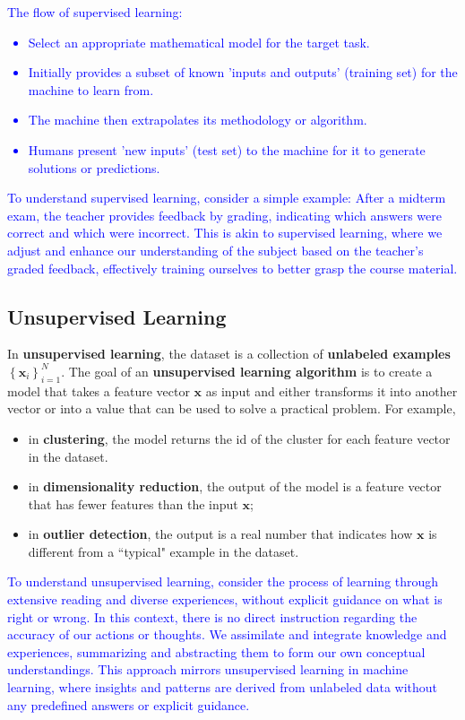 \textcolor{blue}{The flow of supervised learning:
\begin{itemize}
    \item Select an appropriate mathematical model for the target task.
    \item Initially provides a subset of known 'inputs and outputs' (training set) for the machine to learn from.
    \item The machine then extrapolates its methodology or algorithm.
    \item Humans present 'new inputs' (test set) to the machine for it to generate solutions or predictions.
\end{itemize}
}
\textcolor{blue}{To understand supervised learning, consider a simple example: After a midterm exam, the teacher provides feedback by grading, indicating which answers were correct and which were incorrect. This is akin to supervised learning, where we adjust and enhance our understanding of the subject based on the teacher's graded feedback, effectively training ourselves to better grasp the course material.}

\subsection{Unsupervised Learning}
In \textbf{unsupervised learning}, the dataset is a collection of \textbf{unlabeled examples} $\left\{\mathbf{x}_i\right\}_{i=1}^N$. The goal of an \textbf{unsupervised learning algorithm} is to create a model that takes a feature vector $\mathbf{x}$ as input and either transforms it into another vector or into a value that can be used to solve a practical problem. For example,
\begin{itemize}
	\item in \textbf{clustering}, the model returns the id of the cluster for each feature vector in the dataset.
	\item in \textbf{dimensionality reduction}, the output of the model is a feature vector that has fewer features than the input $\mathbf{x}$;
	\item in \textbf{outlier detection}, the output is a real number that indicates how $\mathbf{x}$ is different from a ``typical" example in the dataset.
\end{itemize}
\textcolor{blue}{To understand unsupervised learning, consider the process of learning through extensive reading and diverse experiences, without explicit guidance on what is right or wrong. In this context, there is no direct instruction regarding the accuracy of our actions or thoughts. We assimilate and integrate knowledge and experiences, summarizing and abstracting them to form our own conceptual understandings. This approach mirrors unsupervised learning in machine learning, where insights and patterns are derived from unlabeled data without any predefined answers or explicit guidance.}
